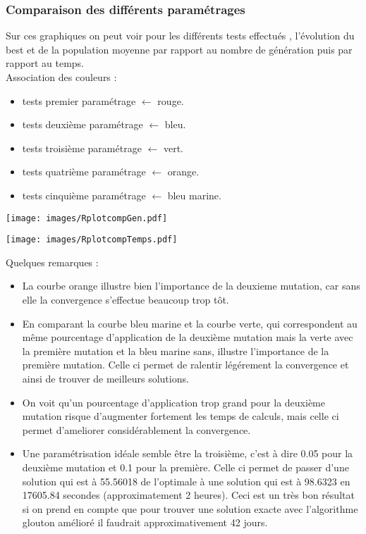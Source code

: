 \documentclass[a4paper]{report}
\begin{document}
\subsubsection*{Comparaison des différents paramétrages}
Sur ces graphiques on peut voir pour les différents tests effectués , l'évolution du best et de la population moyenne par rapport au nombre de génération puis par rapport au temps.\\
Association des couleurs :\\
\begin{itemize}
  \item tests premier paramétrage $\leftarrow $ rouge.\\
  \item tests deuxième paramétrage $\leftarrow $ bleu.\\
  \item tests troisième paramétrage $\leftarrow $ vert.\\
  \item tests quatrième paramétrage $\leftarrow $ orange.\\
  \item tests cinquième paramétrage $\leftarrow $ bleu marine.\\
\end{itemize}
\begin{center}

\texttt{[image: images/RplotcompGen.pdf]}
\end{center}
\begin{center}
\texttt{[image: images/RplotcompTemps.pdf]}
\end{center}
Quelques remarques :
\begin{itemize}
  \item La courbe orange illustre bien l'importance de la deuxieme mutation, car sans elle la convergence s'effectue beaucoup trop tôt.\\
  \item En comparant la courbe bleu marine et la courbe verte, qui correspondent au même pourcentage d'application de la deuxième mutation mais la verte avec la première mutation et la bleu marine sans, illustre l'importance de la première mutation. Celle ci permet de ralentir légérement la convergence et ainsi de trouver de meilleurs solutions.
  \item  On voit qu'un pourcentage d'application trop grand pour la deuxième mutation risque d'augmenter fortement les temps de calculs, mais celle ci permet d'ameliorer considérablement la convergence.
  \item Une paramétrisation idéale semble être la troisième, c'est à dire 0.05 pour la deuxième mutation et 0.1 pour la première. Celle ci permet de passer d'une solution qui est à 55.56018 de l'optimale à une solution qui est à 98.6323 en  17605.84 secondes (approximatement 2 heures). Ceci est un très bon résultat si on prend en compte que pour trouver une solution exacte avec l'algorithme glouton amélioré il faudrait approximativement 42 jours.
  
\end{itemize}
\end{document}
